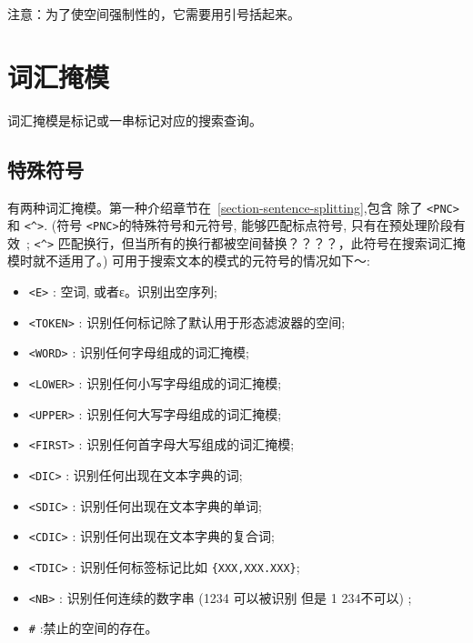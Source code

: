 \bigskip
\noindent 注意：为了使空间强制性的，它需要用引号括起来。




\section{词汇掩模}
 词汇掩模是标记或一串标记对应的搜索查询。

\subsection{特殊符号}
\label{section-special-symbols}

有两种词汇掩模。第一种介绍章节在~\ref{section-sentence-splitting},包含 除了 \verb$<PNC>$ 和  \verb+<^>+. (符号 \verb$<PNC>$的特殊符号和元符号,
能够匹配标点符号, 只有在预处理阶段有效~; \verb+<^>+ 匹配换行，但当所有的换行都被空间替换？？？？，此符号在搜索词汇掩模时就不适用了。) 可用于搜索文本的模式的元符号的情况如下～:

\index{\verb+#+}
\begin{itemize}
  \item \verb+<E>+ : 空词, 或者ε。识别出空序列;
  \item \verb+<TOKEN>+ : 识别任何标记除了默认用于形态滤波器的空间;
  \item \verb+<WORD>+ : 识别任何字母组成的词汇掩模;
  \item \verb+<LOWER>+ : 识别任何小写字母组成的词汇掩模;
  \item \verb+<UPPER>+ : 识别任何大写字母组成的词汇掩模;
  \item \verb+<FIRST>+ : 识别任何首字母大写组成的词汇掩模;
  \item \verb+<DIC>+ : 识别任何出现在文本字典的词;
  \item \verb+<SDIC>+ : 识别任何出现在文本字典的单词;  
  \item \verb+<CDIC>+ : 识别任何出现在文本字典的复合词;
  \item \verb+<TDIC>+ : 识别任何标签标记比如
  	  \verb+{XXX,XXX.XXX}+;
  \item \verb+<NB>+ : 识别任何连续的数字串
  	  (1234 可以被识别 但是 1 234不可以) ;
  \item \verb+#+ :禁止的空间的存在。
\end{itemize}


